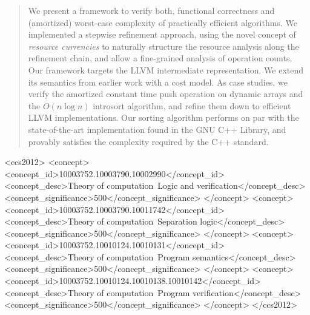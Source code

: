 \documentclass[acmsmall]{acmart}
\begin{document}
\begin{abstract}
We present a framework to verify both, functional correctness and (amortized) worst-case complexity of practically efficient algorithms. 
%
We implemented a stepwise refinement approach, using the novel concept of \emph{resource currencies} to naturally structure the resource analysis along the refinement chain, and allow a fine-grained analysis of operation counts.
%
Our framework targets the LLVM intermediate representation.
We extend its semantics from earlier work with a cost model. 
%
As case studies, we verify the amortized constant time push operation on dynamic arrays and the $O(n\log n)$ introsort algorithm,
and refine them down to efficient LLVM implementations.
%
Our sorting algorithm performs on par with the state-of-the-art implementation found in the GNU C++ Library, and provably satisfies the complexity required by the C++ standard.






\end{abstract}

\begin{CCSXML}
<ccs2012>
   <concept>
       <concept_id>10003752.10003790.10002990</concept_id>
       <concept_desc>Theory of computation~Logic and verification</concept_desc>
       <concept_significance>500</concept_significance>
       </concept>
   <concept>
       <concept_id>10003752.10003790.10011742</concept_id>
       <concept_desc>Theory of computation~Separation logic</concept_desc>
       <concept_significance>500</concept_significance>
       </concept>
   <concept>
       <concept_id>10003752.10010124.10010131</concept_id>
       <concept_desc>Theory of computation~Program semantics</concept_desc>
       <concept_significance>500</concept_significance>
       </concept>
   <concept>
       <concept_id>10003752.10010124.10010138.10010142</concept_id>
       <concept_desc>Theory of computation~Program verification</concept_desc>
       <concept_significance>500</concept_significance>
       </concept>
 </ccs2012>
\end{CCSXML}
\end{document}
